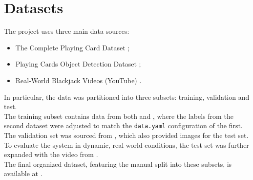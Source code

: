 \section{Datasets}
The project uses three main data sources:
\begin{itemize}
    \item The Complete Playing Card Dataset \cite{shah_kaggle};
    \item Playing Cards Object Detection Dataset \cite{andy8744_kaggle};
    \item Real-World Blackjack Videos (YouTube) \cite{bluff_blackjack}.
\end{itemize}
In particular, the data was partitioned into three subsets: training, validation and test. \\
The training subset contains data from both \cite{shah_kaggle} and \cite{andy8744_kaggle}, where 
the labels from the second dataset were adjusted to match the \texttt{data.yaml} configuration of the first.
The validation set was sourced from \cite{andy8744_kaggle}, which also provided images for the test set. 
To evaluate the system in dynamic, real-world conditions, the test set was further expanded with the video 
from \cite{bluff_blackjack}. \\
The final organized dataset, featuring the manual split into these subsets, is available at \cite{annunziata_kaggle}.